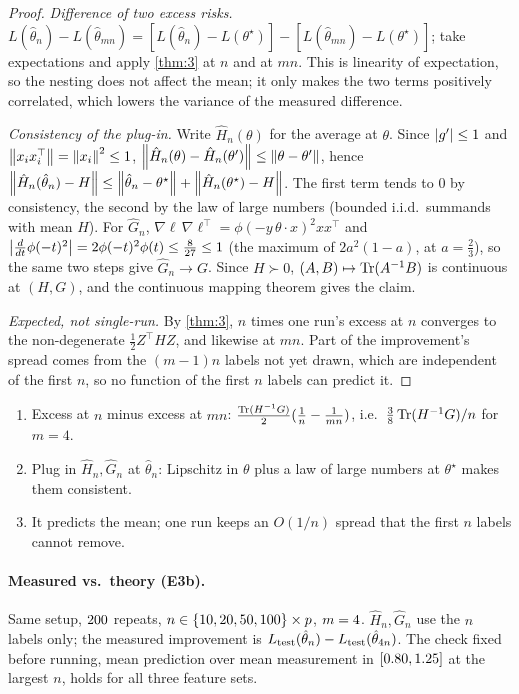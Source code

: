 \begin{proof}
\emph{Difference of two excess risks.} $L(\hat\theta_n)-L(\hat\theta_{mn})=[L(\hat\theta_n)-L(\theta^\star)]-
[L(\hat\theta_{mn})-L(\theta^\star)]$; take expectations and apply \cref{thm:3} at $n$ and at $mn$.
This is linearity of expectation, so the nesting does not affect the mean; it only makes the two
terms positively correlated, which lowers the variance of the measured difference.

\emph{Consistency of the plug-in.} Write $\hat H_n(\theta)$ for the average at $\theta$. Since
$\left\lvert g' \right\rvert\le1$ and $\left\lVert x_ix_i^\top \right\rVert=\left\lVert x_i \right\rVert^2\le1$,
$\left\lVert \hat H_n(\theta)-\hat H_n(\theta') \right\rVert\le\left\lVert \theta-\theta' \right\rVert$, hence
$\left\lVert \hat H_n(\hat\theta_n)-H \right\rVert\le\left\lVert \hat\theta_n-\theta^\star \right\rVert+\left\lVert \hat H_n(\theta^\star)-H \right\rVert$. The
first term tends to 0 by consistency, the second by the law of large numbers (bounded i.i.d.\
summands with mean $H$). For $\hat G_n$, $\nabla\ell\,\nabla\ell^\top=\phi(-y\,\theta\cdot x)^2xx^\top$ and
$\left\lvert \frac{d}{dt}\phi(-t)^2 \right\rvert=2\phi(-t)^2\phi(t)\le\frac8{27}\le1$ (the maximum of $2a^2(1-a)$, at
$a=\frac23$), so the same two steps give $\hat G_n\to G$. Since $H\succ0$, $(A,B)\mapsto\operatorname{Tr}(A^{-1}B)$
is continuous at $(H,G)$, and the continuous mapping theorem gives the claim.

\emph{Expected, not single-run.} By \cref{thm:3}, $n$ times one run's excess at $n$ converges to the
non-degenerate $\frac12Z^\top HZ$, and likewise at $mn$. Part of the improvement's spread comes from
the $(m-1)n$ labels not yet drawn, which are independent of the first $n$, so no function of the
first $n$ labels can predict it.
\end{proof}

\begin{inshort}
\begin{enumerate}[leftmargin=*]
  \item Excess at $n$ minus excess at $mn$: $\frac{\operatorname{Tr}(H^{-1}G)}2(\frac1n-\frac1{mn})$, i.e.\
    $\frac38\operatorname{Tr}(H^{-1}G)/n$ for $m=4$.
  \item Plug in $\hat H_n,\hat G_n$ at $\hat\theta_n$: Lipschitz in $\theta$ plus a law of large
    numbers at $\theta^\star$ makes them consistent.
  \item It predicts the mean; one run keeps an $O(1/n)$ spread that the first $n$ labels cannot remove.
\end{enumerate}
\end{inshort}

\paragraph{Measured vs.\ theory (E3b).} Same setup, $200$ repeats,
$n\in\{10, 20, 50, 100\}\times p$, $m=4$. $\hat H_n,\hat G_n$ use the $n$ labels only; the
measured improvement is $L_{\text{test}}(\hat\theta_n)-L_{\text{test}}(\hat\theta_{4 n})$. The
check fixed before running, mean prediction over mean measurement in
$[0.80,1.25]$ at the largest $n$, holds for all three feature sets.


